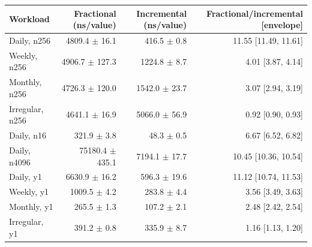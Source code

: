 \begin{tabular}{lrrr}
\toprule
Workload & Fractional (ns/value) & Incremental (ns/value) & Fractional/incremental [envelope] \\
\midrule
Daily, n256 & 4809.4 $\pm$ 16.1 & 416.5 $\pm$ 0.8 & 11.55 [11.49, 11.61] \\
Weekly, n256 & 4906.7 $\pm$ 127.3 & 1224.8 $\pm$ 8.7 & 4.01 [3.87, 4.14] \\
Monthly, n256 & 4726.3 $\pm$ 120.0 & 1542.0 $\pm$ 23.7 & 3.07 [2.94, 3.19] \\
Irregular, n256 & 4641.1 $\pm$ 16.9 & 5066.0 $\pm$ 56.9 & 0.92 [0.90, 0.93] \\
Daily, n16 & 321.9 $\pm$ 3.8 & 48.3 $\pm$ 0.5 & 6.67 [6.52, 6.82] \\
Daily, n4096 & 75180.4 $\pm$ 435.1 & 7194.1 $\pm$ 17.7 & 10.45 [10.36, 10.54] \\
Daily, y1 & 6630.9 $\pm$ 16.2 & 596.3 $\pm$ 19.6 & 11.12 [10.74, 11.53] \\
Weekly, y1 & 1009.5 $\pm$ 4.2 & 283.8 $\pm$ 4.4 & 3.56 [3.49, 3.63] \\
Monthly, y1 & 265.5 $\pm$ 1.3 & 107.2 $\pm$ 2.1 & 2.48 [2.42, 2.54] \\
Irregular, y1 & 391.2 $\pm$ 0.8 & 335.9 $\pm$ 8.7 & 1.16 [1.13, 1.20] \\
\bottomrule
\end{tabular}
